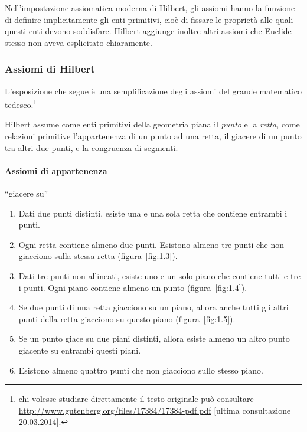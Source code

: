 Nell'impostazione assiomatica moderna di Hilbert, gli assiomi hanno 
la funzione di definire implicitamente gli enti primitivi, cioè di 
fissare le proprietà alle quali questi enti devono soddisfare. 
Hilbert aggiunge inoltre altri assiomi che Euclide stesso non aveva 
esplicitato chiaramente.

\subsubsection*{Assiomi di Hilbert}\label{sect:ass_Hilbert}

L'esposizione che segue è una semplificazione degli assiomi del 
grande matematico tedesco.\footnote{chi volesse studiare direttamente 
il testo originale può consultare 
\url{http://www.gutenberg.org/files/17384/17384-pdf.pdf} [ultima 
consultazione 20.03.2014].}

Hilbert assume come enti primitivi della geometria piana il 
\emph{punto} e la \emph{retta}, come relazioni primitive 
l'appartenenza di un punto ad una retta, il giacere di un punto tra 
altri due punti, e la congruenza di segmenti.

\paragraph{Assiomi di appartenenza} ``giacere su''
\begin{enumerate}[label=\Roman{*}.]
\item Dati due punti distinti, esiste una e una sola retta che 
contiene entrambi i punti.
\item Ogni retta contiene almeno due punti. Esistono almeno tre punti 
che non giacciono sulla stessa retta (figura~\ref{fig:1.3}).
\item Dati tre punti non allineati, esiste uno e un solo piano che 
contiene tutti e tre i punti. Ogni piano contiene almeno un punto 
(figura~\ref{fig:1.4}).
\item Se due punti di una retta giacciono su un piano, allora anche 
tutti gli altri punti della retta giacciono su questo piano 
(figura~\ref{fig:1.5}).
\item Se un punto giace su due piani distinti, allora esiste almeno 
un altro punto giacente su entrambi questi piani.
\item Esistono almeno quattro punti che non giacciono sullo stesso 
piano.
\end{enumerate}


